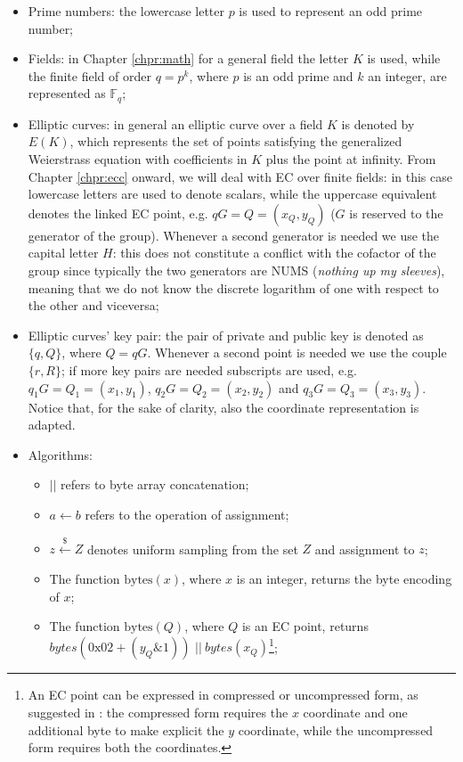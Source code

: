 \begin{itemize}
\item Prime numbers: the lowercase letter $p$ is used to represent an odd prime number;
\item Fields: in Chapter \ref{chpr:math} for a general field the letter $K$ is used, while the finite field of order $q = p^k$, where $p$ is an odd prime and $k$ an integer, are represented as $\mathbb{F}_q$;
\item Elliptic curves: in general an elliptic curve over a field $K$ is denoted by $E(K)$, which represents the set of points satisfying the generalized Weierstrass equation with coefficients in $K$ plus the point at infinity. From Chapter \ref{chpr:ecc} onward, we will deal with EC over finite fields: in this case lowercase letters are used to denote scalars, while the uppercase equivalent denotes the linked EC point, e.g. $qG = Q = (x_Q, y_Q)$ ($G$ is reserved to the generator of the group). Whenever a second generator is needed we use the capital letter $H$: this does not constitute a conflict with the cofactor of the group since typically the two generators are NUMS (\textit{nothing up my sleeves}), meaning that we do not know the discrete logarithm of one with respect to the other and viceversa;
\item Elliptic curves' key pair: the pair of private and public key is denoted as $\{q, Q\}$, where $Q = qG$. Whenever a second point is needed we use the couple $\{r, R\}$; if more key pairs are needed subscripts are used, e.g. $q_1G = Q_1 = (x_1, y_1)$, $q_2G = Q_2 = (x_2, y_2)$ and $q_3G = Q_3 = (x_3, y_3)$. Notice that, for the sake of clarity, also the coordinate representation is adapted.
\item Algorithms:
    \begin{itemize}
		\item $||$ refers to byte array concatenation;
		\item $a \gets b$ refers to the operation of assignment;
		\item $z \xleftarrow{\text{\$}} Z$ denotes uniform sampling from the set $Z$ and assignment to $z$;
		\item The function $\text{bytes}(x)$, where $x$ is an integer, returns the byte encoding of $x$;
		\item The function $\text{bytes}(Q)$, where $Q$ is an EC point, returns $bytes(0\text{x}02 + (y_Q \& 1))$ $ || \ bytes(x_Q)$\footnote{An EC point can be expressed in compressed or uncompressed form, as suggested in \cite{RefWork:2}: the compressed form requires the $x$ coordinate and one additional byte to make explicit the $y$ coordinate, while the uncompressed form requires both the coordinates.};

\end{itemize}
\end{itemize}
